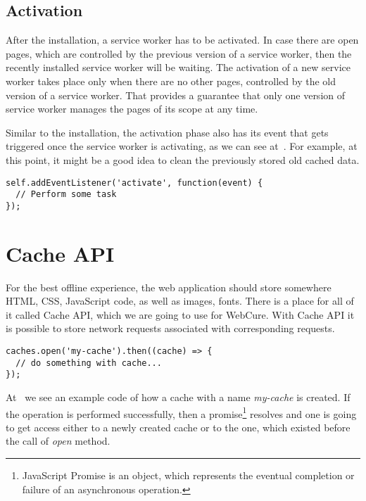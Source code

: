 \subsection*{Activation}

After the installation, a service worker has to be activated. In case there are open pages, which are controlled by the previous version of a service worker, then the recently installed service worker will be waiting. The activation of a new service worker takes place only when there are no other pages, controlled by the old version of a service worker. That provides a guarantee that only one version of service worker manages the pages of its scope at any time.

Similar to the installation, the activation phase also has its event that gets triggered once the service worker is activating, as we can see at~. For example, at this point, it might be a good idea to clean the previously stored old cached data.

\begin{lstlisting}[caption={An example code, which demonstates a listener for the \textit{activation} service worker's event\cite{32}.}, label={lst:tech4}]
self.addEventListener('activate', function(event) {
  // Perform some task
});
\end{lstlisting}

\section{Cache API}
\label{CacheAPI}

For the best offline experience, the web application should store somewhere HTML, CSS, JavaScript code, as well as images, fonts. There is a place for all of it called Cache API, which we are going to use for WebCure. With Cache API it is possible to store network requests associated with corresponding requests.

\begin{lstlisting}[caption={An example code, which demonstrates how one can create cache storage called \textit{my-cache}\cite{34}.}, label={lst:tech6}]
caches.open('my-cache').then((cache) => {
  // do something with cache...
});
\end{lstlisting}

At~ we see an example code of how a cache with a name \textit{my-cache} is created. If the operation is performed successfully, then a promise\footnote{JavaScript Promise is an object, which represents the eventual completion or failure of an asynchronous operation\cite{37}.} resolves and one is going to get access either to a newly created cache or to the one, which existed before the call of \textit{open} method.

